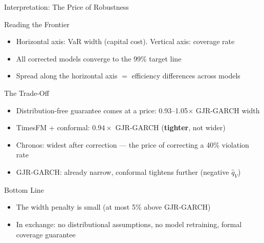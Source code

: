 \documentclass[9pt, aspectratio=169, t]{beamer}
\newcommand{\qV}{\hat{q}_V}
\begin{document}
\begin{frame}{Interpretation: The Price of Robustness}
	\vspace{-0.3cm}
	{\footnotesize
	\begin{block}{Reading the Frontier}
		\begin{itemize}\setlength{\itemsep}{1pt}
			\item Horizontal axis: VaR width (capital cost). Vertical axis: coverage rate
			\item All corrected models converge to the 99\% target line
			\item Spread along the horizontal axis $=$ efficiency differences across models
		\end{itemize}
	\end{block}
	\vspace{0mm}
	\begin{exampleblock}{The Trade-Off}
		\begin{itemize}\setlength{\itemsep}{1pt}
			\item Distribution-free guarantee comes at a price: 0.93--1.05$\times$ GJR-GARCH width
			\item TimesFM + conformal: $0.94\times$ GJR-GARCH (\textbf{tighter}, not wider)
			\item Chronos: widest after correction --- the price of correcting a 40\% violation rate
			\item GJR-GARCH: already narrow, conformal tightens further (negative $\qV$)
		\end{itemize}
	\end{exampleblock}
	\vspace{0mm}
	\begin{block}{Bottom Line}
		\begin{itemize}\setlength{\itemsep}{1pt}
			\item The width penalty is small (at most 5\% above GJR-GARCH)
			\item In exchange: no distributional assumptions, no model retraining, formal coverage guarantee
		\end{itemize}
	\end{block}
	}
\end{frame}


\end{document}
